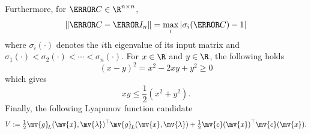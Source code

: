 \documentclass[journal]{IEEEtranTIE}
\newcommand{\CHHA}[1]{{\color{red} [CH: #1]}} %
\newcommand{\KYCH}[1]{{\color{blue} [KC: #1]}} %
\begin{document}
%
%
%
Furthermore, for $\mm{C} \in \R^{n \times n}$,
\begin{equation}
\left\| \mm{C} - \mm{I}_n \right\| = {\max _i}\left| {{\sigma _i}(\mm{C}) - 1} \right|
\label{eq:matrix norm inequality}
\end{equation}
where $\sigma_i(\cdot)$ denotes the $i$th eigenvalue of its input matrix and $\sigma_1(\cdot) < \sigma_2(\cdot) < \cdots < \sigma_n(\cdot)$.
%
For $x \in \R$ and $y \in \R$, the following holds
$$
(x - y)^2 = x^2 - 2xy + y^2 \ge 0
$$
which gives
\begin{equation}
xy \le \frac{1}{2}(x^2 + y^2).
\label{eq:real number inequality}
\end{equation}
Finally, the following Lyapunov function candidate 
%
\begin{align}\label{eq:V}
V := \tfrac{1}{2}\mv{g}_{\!L}(\mv{x},\mv{\lambda})^\top \mv{g}_{\!L}(\mv{x},\mv{\lambda}) + \tfrac{1}{2}\mv{c}(\mv{x})^\top\mv{c}(\mv{x}).
\end{align}
%
\end{document}
